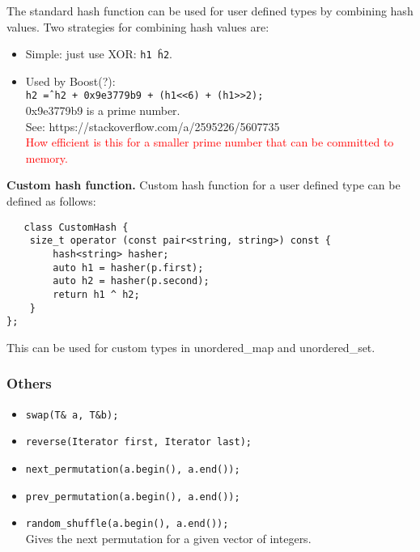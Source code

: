The standard hash function can be used for user defined types by combining hash values.
Two strategies for combining hash values are:
\begin{itemize}
    \item Simple: just use XOR: \texttt{h1 \^ h2}.
    \item Used by Boost(?):\\
    \texttt{h2 \^= h2 + 0x9e3779b9 + (h1<<6) + (h1>>2);}\\
    0x9e3779b9 is a prime number.\\
    See: https://stackoverflow.com/a/2595226/5607735\\
    \textcolor{red}{How efficient is this for a smaller prime number that can be committed to memory.}
\end{itemize}

\textbf{Custom hash function.}
Custom hash function for a user defined type can be defined as follows:
\begin{verbatim}
   class CustomHash {
    size_t operator (const pair<string, string>) const {
        hash<string> hasher;
        auto h1 = hasher(p.first);
        auto h2 = hasher(p.second);
        return h1 ^ h2;
    }
}; 
\end{verbatim}

This can be used for custom types in unordered\_map and unordered\_set.

\subsubsection{Others}

\begin{itemize}
\item \texttt{swap(T\& a, T\&b);}\\
\item \texttt{reverse(Iterator first, Iterator last);}
\item \texttt{next\_permutation(a.begin(), a.end());}\\
\item \texttt{prev\_permutation(a.begin(), a.end());}\\
\item \texttt{random\_shuffle(a.begin(), a.end());}\\
Gives the next permutation for a given vector of integers.
\end{itemize}

\vfill \null
\columnbreak 


